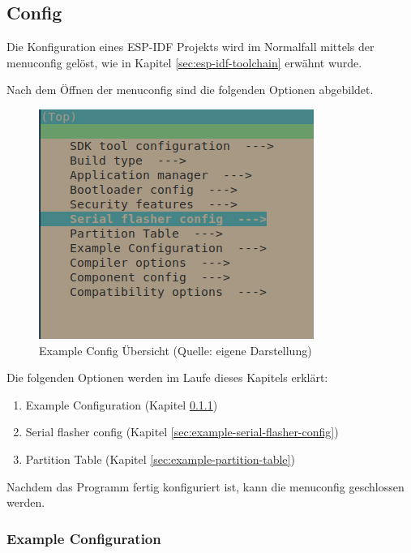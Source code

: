 \subsection{Config}

Die Konfiguration eines ESP-IDF Projekts wird im Normalfall mittels der menuconfig gelöst, wie in Kapitel \ref{sec:esp-idf-toolchain} erwähnt wurde.

\pagebreak

Nach dem Öffnen der menuconfig sind die folgenden Optionen abgebildet.

\begin{figure}[H]
    \begin{center}
        \includegraphics[scale=1]{images/example_config_overview.png}
        \caption{Example Config Übersicht (Quelle: eigene Darstellung)}
        \label{abb:example_config_overview}
    \end{center}
\end{figure}

Die folgenden Optionen werden im Laufe dieses Kapitels erklärt:

\begin{enumerate}
    \item Example Configuration (Kapitel \ref{sec:example-example-config})
    \item Serial flasher config (Kapitel \ref{sec:example-serial-flasher-config})
    \item Partition Table (Kapitel \ref{sec:example-partition-table})
\end{enumerate}

Nachdem das Programm fertig konfiguriert ist, kann die menuconfig geschlossen werden.

\pagebreak

\subsubsection{Example Configuration}\label{sec:example-example-config}

